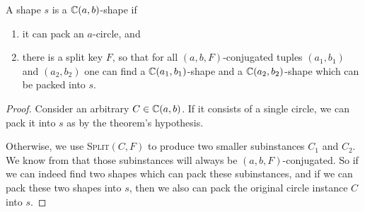 \documentclass[a4paper,style=print,bibliography=totoc,nexus,lnum,extramargin]{tubsbook}
\begin{document}
\begin{theorem}\label{th:split-packing}


    A shape $s$ is a $\mathbb{C}(a,b)$-shape if

    \begin{enumerate}
        \item it can pack an $a$-circle, and
        \item there is a split key $F$, so that for all $(a,b,F)$-conjugated tuples $(a_1, b_1)$ and $(a_2, b_2)$ one can find a $\mathbb{C}(a_1, b_1)$-shape and a $\mathbb{C}(a_2, b_2)$-shape which can be packed into $s$.
    \end{enumerate}

\end{theorem}

\begin{proof}
    Consider an arbitrary $C \in \mathbb{C}(a,b)$.
    If it consists of a single circle, we can pack it into $s$ as by the theorem's hypothesis.

    Otherwise, we use \textsc{Split}$(C,F)$ to produce two smaller subinstances $C_1$ and $C_2$. We know from  that those subinstances will always be $(a,b,F)$-conjugated. So if we can indeed find two shapes which can pack these subinstances, and if we can pack these two shapes into $s$, then we also can pack the original circle instance $C$ into $s$.
\end{proof}

\end{document}
